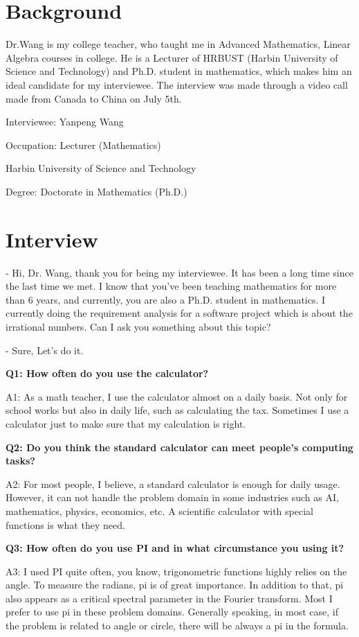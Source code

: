 \documentclass[12pt,letterpaper]{article}
\begin{document}
\section*{Background}

Dr.Wang is my college teacher, who taught me in Advanced Mathematics, Linear Algebra courses in college. He is a Lecturer of HRBUST (Harbin University of Science and Technology) and Ph.D. student in mathematics, which makes him an ideal candidate for my interviewee.
The interview was made through a video call made from Canada to China on July 5th. 


Interviewee: Yanpeng Wang

Occupation: Lecturer (Mathematics)

Harbin University of Science and Technology

Degree: Doctorate in Mathematics (Ph.D.)


\section*{Interview}

- Hi, Dr. Wang, thank you for being my interviewee.  It has been a long time since the last time we met. I know that you've been teaching mathematics for more than 6 years, and currently, you are also a Ph.D. student in mathematics. I currently doing the requirement analysis for a software project which is about the irrational numbers. Can I ask you something about this topic?

- Sure, Let's do it.

\textbf {Q1: How often do you use the calculator?}

A1: As a math teacher, I use the calculator almost on a daily basis. Not only for school works but also in daily life, such as calculating the tax. Sometimes I use a calculator just to make sure that my calculation is right.

\textbf {Q2: Do you think the standard calculator can meet people's computing tasks?}

A2: For most people, I believe, a standard calculator is enough for daily usage.  However, it can not handle the problem domain in some industries such as AI, mathematics, physics, economics, etc. A scientific calculator with special functions is what they need. 

\textbf {Q3: How often do you use PI and in what circumstance you using it?}

A3: I used PI quite often, you know, trigonometric functions highly relies on the angle. To measure the radians, pi is of great importance. In addition to that, pi also appears as a critical spectral parameter in the Fourier transform. Most I prefer to use pi in these problem domains. Generally speaking, in most case, if the problem is related to angle or circle, there will be always a pi in the formula.
\end{document}
